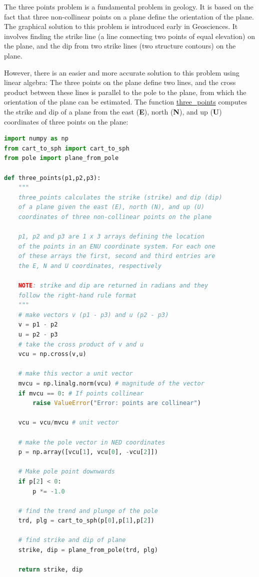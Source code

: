 \documentclass[a4paper , 12pt]{book}
\begin{document}
The three points problem is a fundamental problem in geology. It is based on the fact that three non-collinear points on a plane define the orientation of the plane. The graphical solution to this problem is introduced early in Geosciences. It involves finding the strike line (a line connecting two points of equal elevation) on the plane, and the dip from two strike lines (two structure contours) on the plane. 

However, there is an easier and more accurate solution to this problem using linear algebra: The three points on the plane define two lines, and the cross product between these lines is parallel to the pole to the plane, from which the orientation of the plane can be estimated. The function \href{https://github.com/nfcd/compGeo/blob/master/source/functions/three_points.py}{three\_points} computes the strike and dip of a plane from the east (\textbf{E}), north (\textbf{N}), and up (\textbf{U}) coordinates of three points on the plane:

\begin{center}
\begin{lstlisting}[language=Python, frame=single]
import numpy as np
from cart_to_sph import cart_to_sph
from pole import plane_from_pole

def three_points(p1,p2,p3):
	"""
	three_points calculates the strike (strike) and dip (dip)
	of a plane given the east (E), north (N), and up (U)
	coordinates of three non-collinear points on the plane
	
	p1, p2 and p3 are 1 x 3 arrays defining the location
	of the points in an ENU coordinate system. For each one
	of these arrays the first, second and third entries are 
	the E, N and U coordinates, respectively
	
	NOTE: strike and dip are returned in radians and they
	follow the right-hand rule format
	"""
	# make vectors v (p1 - p3) and u (p2 - p3)
	v = p1 - p2
	u = p2 - p3
	# take the cross product of v and u
	vcu = np.cross(v,u)
	
	# make this vector a unit vector
	mvcu = np.linalg.norm(vcu) # magnitude of the vector
	if mvcu == 0: # If points collinear
		raise ValueError("Error: points are collinear")
	
	vcu = vcu/mvcu # unit vector
	
	# make the pole vector in NED coordinates
	p = np.array([vcu[1], vcu[0], -vcu[2]])
	
	# Make pole point downwards
	if p[2] < 0:
		p *= -1.0
	
	# find the trend and plunge of the pole
	trd, plg = cart_to_sph(p[0],p[1],p[2])
	
	# find strike and dip of plane
	strike, dip = plane_from_pole(trd, plg)
	
	return strike, dip
\end{lstlisting}
\end{center}
\end{document}
